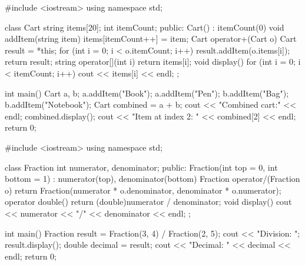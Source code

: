 \outputlabel
{}


\codelabel

\begin{code}
#include <iostream>
using namespace std;

class Cart {
    string items[20]; int itemCount;
public:
    Cart() : itemCount(0) {}
    void addItem(string item) { items[itemCount++] = item; }
    Cart operator+(Cart o) {
        Cart result = *this;
        for (int i = 0; i < o.itemCount; i++) result.addItem(o.items[i]);
        return result;
    }
    string operator[](int i) { return items[i]; }
    void display() { for (int i = 0; i < itemCount; i++) cout << items[i] << endl; }
};

int main() {
    Cart a, b;
    a.addItem("Book"); a.addItem("Pen");
    b.addItem("Bag"); b.addItem("Notebook");
    Cart combined = a + b;
    cout << "Combined cart:" << endl; combined.display();
    cout << "Item at index 2: " << combined[2] << endl;
    return 0;
}
\end{code}

\outputlabel
{}


\codelabel

\begin{code}
#include <iostream>
using namespace std;

class Fraction {
    int numerator, denominator;
public:
    Fraction(int top = 0, int bottom = 1) : numerator(top), denominator(bottom) {}
    Fraction operator/(Fraction o) {
        return Fraction(numerator * o.denominator, denominator * o.numerator);
    }
    operator double() { return (double)numerator / denominator; }
    void display() { cout << numerator << "/" << denominator << endl; }
};

int main() {
    Fraction result = Fraction(3, 4) / Fraction(2, 5);
    cout << "Division: "; result.display();
    double decimal = result;
    cout << "Decimal: " << decimal << endl;
    return 0;
}
\end{code}

\outputlabel
{}
